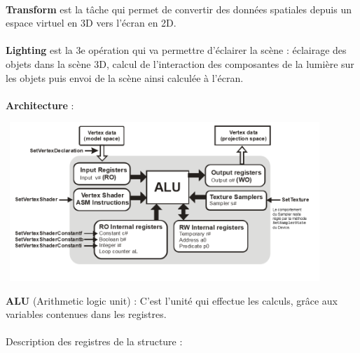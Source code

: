 \textbf{\\Transform} est la tâche qui permet de convertir des données spatiales depuis un espace virtuel en 3D vers l'écran en 2D.
\\\\
\textbf{Lighting} est la 3e opération qui va permettre d'éclairer la scène : éclairage des objets dans la scène 3D, calcul de l'interaction des composantes de la lumière sur les objets puis envoi de la scène ainsi calculée à l'écran.
\\\\
\textbf{Architecture} :
\\
\begin{center}
\includegraphics[width=12cm,height=60mm]{leo/images/ArchiVertex.png}
\end{center}

\textbf{ALU} (Arithmetic logic unit) : C’est l’unité qui effectue les calculs, grâce aux variables contenues dans les registres.
\\\\
Description des registres de la structure :

